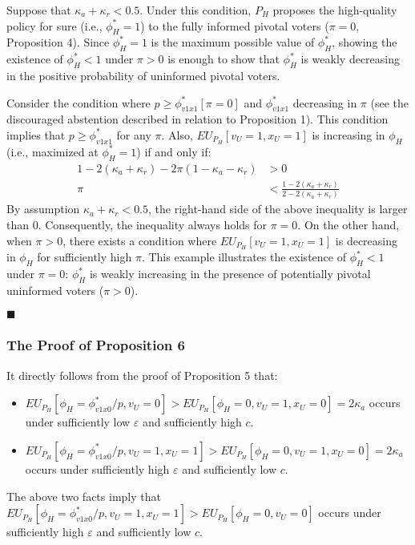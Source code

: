 \par Suppose that $\kappa_a+\kappa_r<0.5$. Under this condition, $P_H$ proposes the high-quality policy for sure (i.e., $\phi^*_H=1$) to the fully informed pivotal voters ($\pi=0$, Proposition 4). Since $\phi^*_H=1$ is the maximum possible value of $\phi^*_H$, showing the existence of $\phi^*_H<1$ under $\pi>0$ is enough to show that $\phi^*_H$ is weakly decreasing in the positive probability of uninformed pivotal voters. 

\par Consider the condition where $p \geq \phi^*_{v1x1}[\pi=0]$ and $\phi^*_{v1x1}$ decreasing in $\pi$ (see the discouraged abstention described in relation to Proposition 1). This condition implies that $p \geq \phi^*_{v1x1}$ for any $\pi$. Also, $EU_{P_H}[v_U=1,x_U=1]$ is increasing in $\phi_H$ (i.e., maximized at $\phi^*_H=1$) if and only if:
\begin{align*}
1-2(\kappa_a+\kappa_r)-2\pi(1-\kappa_a-\kappa_r)&>0\\
\pi &< \frac{1-2(\kappa_a+\kappa_r)}{2-2(\kappa_a+\kappa_r)}
\end{align*}
\noindent By assumption $\kappa_a+\kappa_r<0.5$, the right-hand side of the above inequality is larger than $0$. Consequently, the inequality always holds for $\pi=0$. On the other hand, when $\pi>0$, there exists a condition where $EU_{P_H}[v_U=1,x_U=1]$ is decreasing in $\phi_H$ for sufficiently high $\pi$. This example illustrates the existence of $\phi^*_H<1$ under $\pi=0$: $\phi^*_H$ is weakly increasing in the presence of potentially pivotal uninformed voters ($\pi>0$). 

\hfill $\blacksquare$

\subsubsection{The Proof of Proposition 6}

\par It directly follows from the proof of Proposition 5 that:
\begin{itemize}
	\item $EU_{P_H}[\phi_H = \phi^*_{v1x0}/p, v_U = 0] > EU_{P_H}[\phi_H=0, v_U=1, x_U=0]=2\kappa_a$ occurs under sufficiently low $\varepsilon$ and sufficiently high $c$. 
	\item $EU_{P_H}[\phi_H = \phi^*_{v1x0}/p, v_U = 1, x_U = 1] > EU_{P_H}[\phi_H=0, v_U=1, x_U=0]=2\kappa_a$ occurs under sufficiently high $\varepsilon$ and sufficiently low $c$.
\end{itemize}
\noindent The above two facts imply that $EU_{P_H}[\phi_H = \phi^*_{v1x0}/p, v_U = 1, x_U = 1] > EU_{P_H}[\phi_H=0, v_U=0]$ occurs under sufficiently high $\varepsilon$ and sufficiently low $c$.

